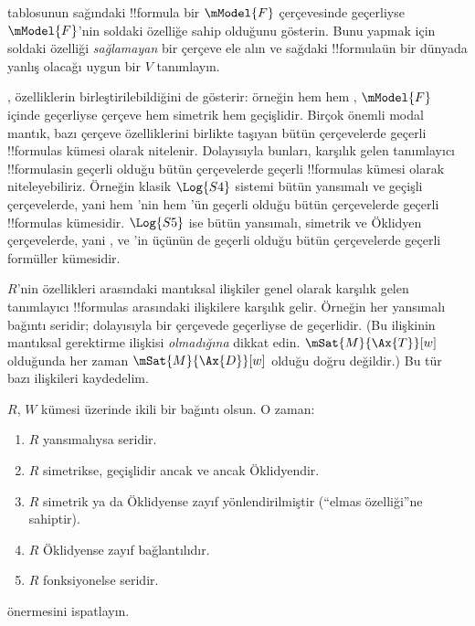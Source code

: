 \begin{prob}
 tablosunun sağındaki !!{formula}
bir $\mModel{F}$ çerçevesinde geçerliyse $\mModel{F}$'nin soldaki özelliğe
sahip olduğunu gösterin. Bunu yapmak için soldaki özelliği
\emph{sağlamayan} bir çerçeve ele alın ve sağdaki !!{formula}{}ün bir
dünyada yanlış olacağı uygun bir $V$ tanımlayın.
\end{prob}

, özelliklerin birleştirilebildiğini de
gösterir: örneğin hem  hem , $\mModel{F}$ içinde geçerliyse
çerçeve hem simetrik hem geçişlidir. Birçok önemli modal mantık, bazı
çerçeve özelliklerini birlikte taşıyan bütün çerçevelerde geçerli
!!{formula}s kümesi olarak nitelenir. Dolayısıyla bunları, karşılık gelen
tanımlayıcı !!{formula}s{}in geçerli olduğu bütün çerçevelerde geçerli
!!{formula}s kümesi olarak niteleyebiliriz. Örneğin klasik $\Log{S4}$
sistemi bütün yansımalı ve geçişli çerçevelerde, yani hem 'nin hem
'ün geçerli olduğu bütün çerçevelerde geçerli !!{formula}s kümesidir.
$\Log{S5}$ ise bütün yansımalı, simetrik ve Öklidyen çerçevelerde, yani
,  ve 'in üçünün de geçerli olduğu bütün çerçevelerde
geçerli formüller kümesidir.

$R$'nin özellikleri arasındaki mantıksal ilişkiler genel olarak karşılık
gelen tanımlayıcı !!{formula}s arasındaki ilişkilere karşılık gelir.
Örneğin her yansımalı bağıntı seridir; dolayısıyla  bir çerçevede
geçerliyse  de geçerlidir. (Bu ilişkinin mantıksal gerektirme ilişkisi
\emph{olmadığına} dikkat edin. $\mSat{M}{\Ax{T}}[w]$ olduğunda her zaman
$\mSat{M}{\Ax{D}}[w]$ olduğu doğru değildir.) Bu tür bazı ilişkileri
kaydedelim.

\begin{prop}
  $R$, $W$ kümesi üzerinde ikili bir bağıntı olsun. O zaman:
  \begin{enumerate}
  \item $R$ yansımalıysa seridir.
  \item $R$ simetrikse, geçişlidir ancak ve ancak Öklidyendir.
  \item $R$ simetrik ya da Öklidyense zayıf yönlendirilmiştir
    (``elmas özelliği''ne sahiptir).
  \item $R$ Öklidyense zayıf bağlantılıdır.
  \item $R$ fonksiyonelse seridir.
  \end{enumerate}
\end{prop}

\begin{prob}
   önermesini ispatlayın.
\end{prob}

